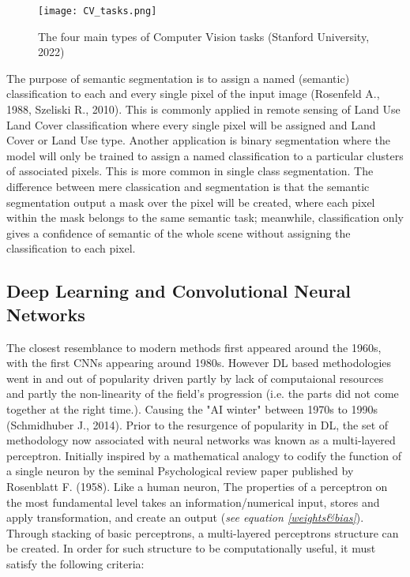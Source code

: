 \documentclass[11pt, a4paper, twoside]{report}
\begin{document}
\begin{figure}[H]
\centering
\texttt{[image: CV\_tasks.png]}
  \caption{The four main types of Computer Vision tasks (Stanford University, 2022)}
\label{fig:CV_tasks}
\end{figure}

The purpose of semantic segmentation is to assign a named (semantic) classification to each and every single pixel of the input image (Rosenfeld A., 1988, Szeliski R., 2010). This is commonly applied in remote sensing of Land Use Land Cover classification where every single pixel will be assigned and Land Cover or Land Use type. Another application is binary segmentation where the model will only be trained to assign a named classification to a particular clusters of associated pixels. This is more common in single class segmentation. The difference between mere classication and segmentation is that the semantic segmentation output a mask over the pixel will be created, where each pixel within the mask belongs to the same semantic task; meanwhile, classification only gives a confidence of semantic of the whole scene without assigning the classification to each pixel.\\\par

\subsection{Deep Learning and Convolutional Neural Networks}

The closest resemblance to modern methods first appeared around the 1960s, with the first CNNs appearing around 1980s. However DL based methodologies went in and out of popularity driven partly by lack of computaional resources and partly the non-linearity of the field's progression (i.e. the parts did not come together at the right time.). Causing the "AI winter" between 1970s to 1990s (Schmidhuber J., 2014). Prior to the resurgence of popularity in DL, the set of methodology now associated with neural networks was known as a multi-layered perceptron. Initially inspired by a mathematical analogy to codify the function of a single neuron by the seminal Psychological review paper published by Rosenblatt F. (1958). Like a human neuron, The properties of a perceptron on the most fundamental level takes an information/numerical input, stores and apply transformation, and create an output (\textit{see equation \ref{weights&bias}}). Through stacking of basic perceptrons, a multi-layered perceptrons structure can be created. In order for such structure to be computationally useful, it must satisfy the following criteria:\\\par
\end{document}
